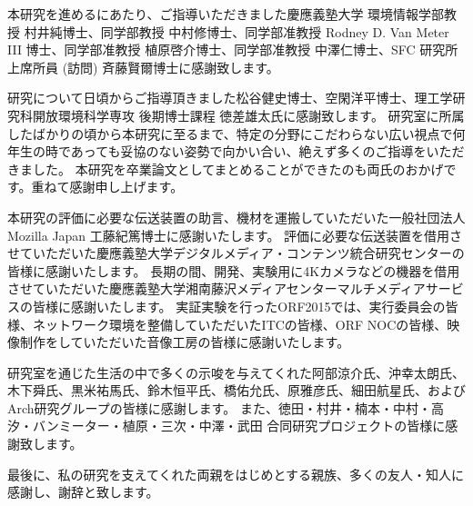 \begin{acknowledgment}

本研究を進めるにあたり、ご指導いただきました慶應義塾大学 環境情報学部教授 村井純博士、同学部教授 中村修博士、同学部准教授 Rodney D. Van Meter III 博士、同学部准教授 植原啓介博士、同学部准教授 中澤仁博士、SFC 研究所 上席所員 (訪問) 斉藤賢爾博士に感謝致します。

研究について日頃からご指導頂きました松谷健史博士、空閑洋平博士、理工学研究科開放環境科学専攻 後期博士課程 徳差雄太氏に感謝致します。
研究室に所属したばかりの頃から本研究に至るまで、特定の分野にこだわらない広い視点で何年生の時であっても妥協のない姿勢で向かい合い、絶えず多くのご指導をいただきました。
本研究を卒業論文としてまとめることができたのも両氏のおかげです。重ねて感謝申し上げます。

本研究の評価に必要な伝送装置の助言、機材を運搬していただいた一般社団法人 Mozilla Japan 工藤紀篤博士に感謝いたします。
評価に必要な伝送装置を借用させていただいた慶應義塾大学デジタルメディア・コンテンツ統合研究センターの皆様に感謝いたします。
長期の間、開発、実験用に4Kカメラなどの機器を借用させていただいた慶應義塾大学湘南藤沢メディアセンターマルチメディアサービスの皆様に感謝いたします。
実証実験を行ったORF2015では、実行委員会の皆様、ネットワーク環境を整備していただいたITCの皆様、ORF NOCの皆様、映像制作をしていただいた音像工房の皆様に感謝いたします。

研究室を通じた生活の中で多くの示唆を与えてくれた阿部涼介氏、沖幸太朗氏、木下舜氏、黒米祐馬氏、鈴木恒平氏、橋佑允氏、原雅彦氏、細田航星氏、およびArch研究グループの皆様に感謝します。
また、徳田・村井・楠本・中村・高汐・バンミーター・植原・三次・中澤・武田 合同研究プロジェクトの皆様に感謝致します。

最後に、私の研究を支えてくれた両親をはじめとする親族、多くの友人・知人に感謝し、謝辞と致します。

\end{acknowledgment}
